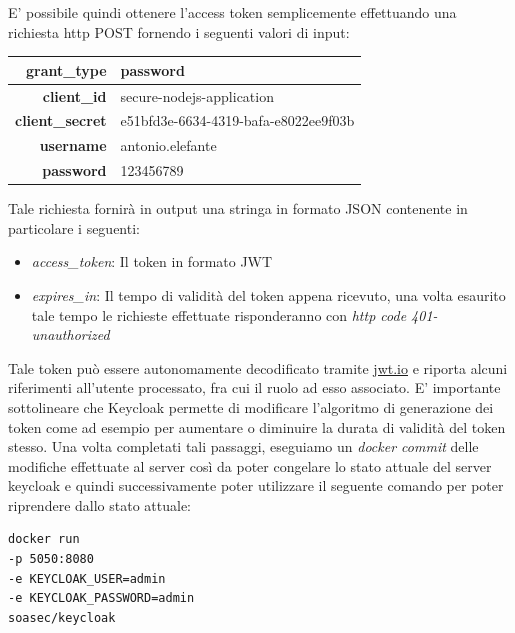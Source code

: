 \documentclass[twoside]{report}
\begin{document}
\bigbreak


E' possibile quindi ottenere l'access token semplicemente effettuando una richiesta http POST fornendo i seguenti valori di input:



\begin{table}[h]
\centering
\begin{tabular}{|r|l|}
\hline
\textbf{grant\_type} & password            \\ \hline
\textbf{client\_id}    & secure-nodejs-application   \\ \hline
\textbf{client\_secret}    & e51bfd3e-6634-4319-bafa-e8022ee9f03b  \\ \hline
\textbf{username}   & antonio.elefante \\ \hline
\textbf{password}   & 123456789 \\ \hline
\end{tabular}
\end{table}
\FloatBarrier

\bigbreak

Tale richiesta fornirà in output una stringa in formato JSON contenente in particolare i seguenti:

\begin{itemize}
	\item \textit{access\_token}: Il token in formato JWT
	\item \textit{expires\_in}: Il tempo di validità del token appena ricevuto, una volta esaurito tale tempo le richieste effettuate risponderanno con \textit{http code 401-unauthorized}
\end{itemize}

Tale token può essere autonomamente decodificato tramite \href{https://jwt.io/}{\underline{jwt.io}} e riporta alcuni riferimenti all'utente processato, fra cui il ruolo ad esso associato.
\bigbreak
E' importante sottolineare che Keycloak permette di modificare l'algoritmo di generazione dei token come ad esempio per aumentare o diminuire la durata di validità del token stesso.
\bigbreak
Una volta completati tali passaggi, eseguiamo un \textit{docker commit} delle modifiche effettuate al server così da poter congelare lo stato attuale del server keycloak e quindi successivamente poter utilizzare il seguente comando per poter riprendere dallo stato attuale:

\begin{listing}[h!]
\begin{verbatim}
docker run 
-p 5050:8080
-e KEYCLOAK_USER=admin
-e KEYCLOAK_PASSWORD=admin
soasec/keycloak
\end{verbatim} 
\end{listing}
\FloatBarrier
\end{document}
